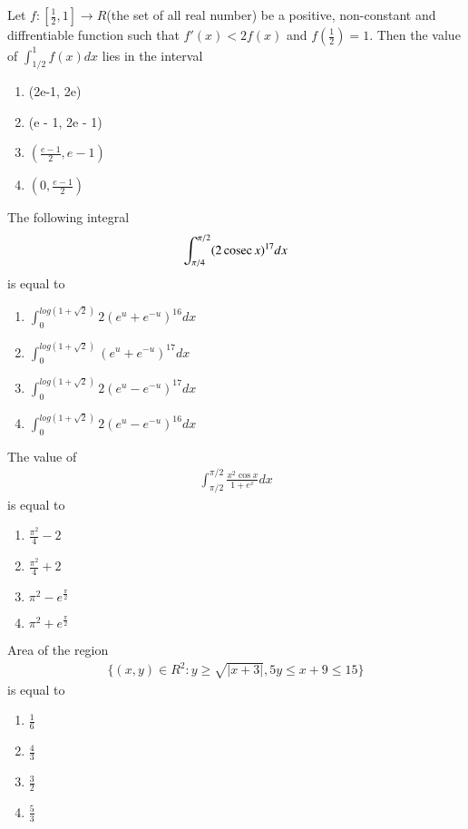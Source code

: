 \item Let $f: [\frac{1}{2}, 1] \to R$(the set of all real number) be a positive, non-constant and diffrentiable function such that $f'(x) < 2f(x)$ and $f(\frac{1}{2}) = 1$. Then the value of $\int_{1/2}^{1}f(x)dx$ lies in the interval
\begin{enumerate}
\item (2e-1, 2e)
\item (e - 1, 2e - 1)
\item $(\frac{e - 1}{2}, e - 1)$
\item $(0, \frac{e - 1}{2})$
\end{enumerate}

\item The following integral
\begin{align*}
\int_{\pi/4}^{\pi/2}(2\,\text{cosec}\, x)^{17}dx
\end{align*}
is equal to
\begin{enumerate}
\item $\int_{0}^{log(1 + \sqrt{2})}2(e^u + e^{-u})^{16}dx$
\item $\int_{0}^{log(1 + \sqrt{2})}(e^u + e^{-u})^{17}dx$
\item $\int_{0}^{log(1 + \sqrt{2})}2(e^u - e^{-u})^{17}dx$
\item $\int_{0}^{log(1 + \sqrt{2})}2(e^u - e^{-u})^{16}dx$
\end{enumerate}

\item The value of 
\begin{align*}
\int_{\pi/2}^{\pi/2}\frac{x^2 \cos x}{1 + e^x}dx
\end{align*}
is equal to
\begin{enumerate}
\item $\frac{\pi^2}{4} - 2$
\item $\frac{\pi^2}{4} + 2$
\item $\pi^2 - e^{\frac{\pi}{2}}$
\item $\pi^2 + e^{\frac{\pi}{2}}$
\end{enumerate}

\item Area of the region
\begin{align*}
\{(x, y) \in R^2: y \geq \sqrt{|x + 3|}, 5y \leq x + 9 \leq 15\}
\end{align*}
is equal to
\begin{enumerate}
\item $\frac{1}{6}$
\item $\frac{4}{3}$
\item $\frac{3}{2}$
\item $\frac{5}{3}$
\end{enumerate}

